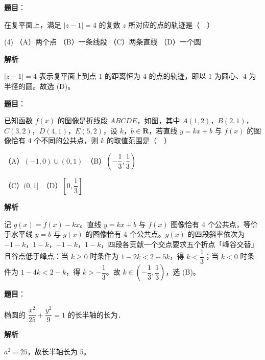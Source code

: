 \begin{answer}

\textbf{题目}：

在复平面上，满足 \(|z-1|=4\) 的复数 \(z\) 所对应的点的轨迹是（　）

\begin{gkopts}(4)
\task （A）两个点
\task （B）一条线段
\task （C）两条直线
\task （D）一个圆
\end{gkopts}

\textbf{解析}

\(|z-1|=4\) 表示复平面上到点 \(1\) 的距离恒为 \(4\) 的点的轨迹，即以 \(1\) 为圆心、\(4\) 为半径的圆。故选 (D)。


\end{answer}
\begin{answer}

\textbf{题目}：

已知函数 \(f(x)\) 的图像是折线段 \(ABCDE\)，如图，其中 \(A(1,2)\)，\(B(2,1)\)，\(C(3,2)\)，\(D(4,1)\)，\(E(5,2)\)，设 \(k\)，\(b\in\mathbf{R}\)，若直线 \(y=kx+b\) 与 \(f(x)\) 的图像恰有 4 个不同的公共点，则 \(k\) 的取值范围是（　）
\nopagebreak[4]
\begin{center}\end{center}
\nopagebreak[4]
（A）\((-1,0)\cup(0,1)\)　（B）\(\left(-\dfrac{1}{3},\dfrac{1}{3}\right)\)

（C）\((0,1]\)　（D）\(\left[0,\dfrac{1}{3}\right]\)

\textbf{解析}

记 \(g(x)=f(x)-kx\)。直线 \(y=kx+b\) 与 \(f(x)\) 图像恰有 4 个公共点，等价于水平线 \(y=b\) 与 \(g(x)\) 的图像恰有 4 个公共点。\(g(x)\) 的四段斜率依次为 \(-1-k\)，\(1-k\)，\(-1-k\)，\(1-k\)，四段各贡献一个交点要求五个折点「峰谷交替」且谷点低于峰点：当 \(k\geqslant 0\) 时条件为 \(1-2k<2-5k\)，得 \(k<\dfrac{1}{3}\)；当 \(k<0\) 时条件为 \(1-4k<2-k\)，得 \(k>-\dfrac{1}{3}\)。故 \(k\in\left(-\dfrac{1}{3},\dfrac{1}{3}\right)\)，选 (B)。


\end{answer}
\begin{answer}

\textbf{题目}：

椭圆的 \(\dfrac{x^{2}}{25}+\dfrac{y^{2}}{9}=1\) 的长半轴的长为\gkblank{}．

\textbf{解析}

\(a^{2}=25\)，故长半轴长为 \(5\)。


\end{answer}
